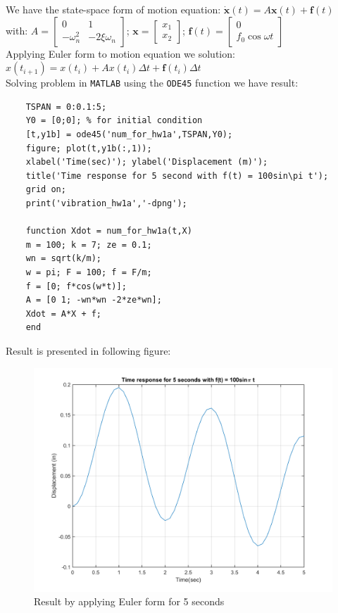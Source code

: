\documentclass[14pt,a4paper]{article}
\begin{document}
\begin{enumerate}
	We have the state-space form of motion equation: \hspace{0.5cm} $\dot{\textbf{x}}(t) = A\textbf{x}(t) + \textbf{f}(t)$\\
	with: $A = \begin{bmatrix} 0&1 \\ -\omega_n^2 & -2\xi\omega_n \end{bmatrix} $; $ \textbf{x} = \begin{bmatrix} x_1 \\ x_2 \end{bmatrix} $; $\textbf{f}(t) = \begin{bmatrix} 0 \\ f_0\cos\omega t \end{bmatrix} $\\
	
	Applying Euler form to motion equation we solution:\\
	\hspace*{3cm}  $x(t_{i+1}) = x(t_i) + Ax(t_i)\Delta t + \textbf{f}(t_i)\Delta t$\\
	Solving problem in \texttt{MATLAB} using the \texttt{ODE45} function we have result:
	\begin{lstlisting}
	TSPAN = 0:0.1:5;
	Y0 = [0;0]; % for initial condition
	[t,y1b] = ode45('num_for_hw1a',TSPAN,Y0);
	figure; plot(t,y1b(:,1));
	xlabel('Time(sec)'); ylabel('Displacement (m)');
	title('Time response for 5 second with f(t) = 100sin\pi t');
	grid on;
	print('vibration_hw1a','-dpng');
	
	function Xdot = num_for_hw1a(t,X)
	m = 100; k = 7; ze = 0.1;
	wn = sqrt(k/m);
	w = pi; F = 100; f = F/m;
	f = [0; f*cos(w*t)];
	A = [0 1; -wn*wn -2*ze*wn];
	Xdot = A*X + f;
	end
	\end{lstlisting}
	
	\label{Figure 1 - Euler form}
	Result is presented in following figure:\\
	\begin{figure}[htp]
		\centering
		\includegraphics[scale =0.7]{vibration_hw1a.png}
		\caption{Result by applying Euler form for 5 seconds}
	\end{figure}
	\pagebreak
	

\end{enumerate}
\end{document}
